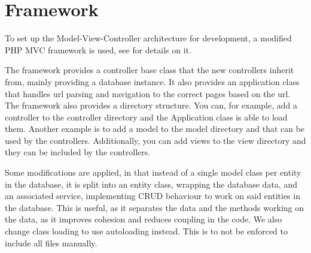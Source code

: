 \section{Framework}
To set up the Model-View-Controller architecture for development, a modified PHP MVC framework is used, see \citep{misc:mvc-framework} for details on it.

The framework provides a controller base class that the new controllers inherit from, mainly providing a database instance.
It also provides an application class that handles url parsing and navigation to the correct pages based on the url.
The framework also provides a directory structure. 
You can, for example, add a controller to the controller directory and the Application class is able to load them. 
Another example is to add a model to the model directory and that can be used by the controllers. 
Additionally, you can add views to the view directory and they can be included by the controllers.

Some modifications are applied, in that instead of a single model class per entity in the database, it is split into an entity class, wrapping the database data, and an associated service, implementing CRUD behaviour to work on said entities in the database.
This is useful, as it separates the data and the methods working on the data, as it improves cohesion and reduces coupling in the code.
We also change class loading to use autoloading instead. This is to not be enforced to include all files manually.